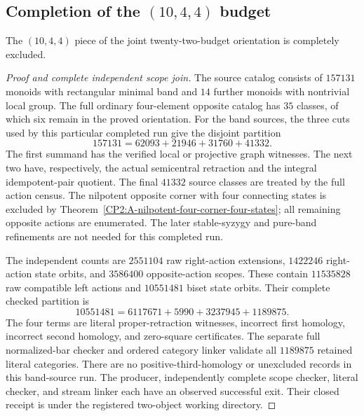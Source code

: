 \subsection{Completion of the $(10,4,4)$ budget}

\begin{proposition}
\label{CP2:A-oriented-eighteen-ten-four-four}
The $(10,4,4)$ piece of the joint twenty-two-budget orientation is
completely excluded.
\end{proposition}
\begin{proof}[Proof and complete independent scope join]
The source catalog consists of $157131$ monoids with rectangular minimal
band and $14$ further monoids with nontrivial local group.
The full ordinary four-element opposite catalog has $35$ classes,
of which six remain in the proved orientation.
For the band sources, the three cuts used by this particular completed
run give the disjoint partition
\[
 157131=62093+21946+31760+41332.
\]
The first summand has the verified local or projective graph witnesses.
The next two have, respectively, the actual semicentral retraction
and the integral idempotent-pair quotient.  The final $41332$ source
classes are treated by the full action census.  The nilpotent opposite
corner with four connecting states is excluded by
Theorem~\ref{CP2:A-nilpotent-four-corner-four-states};
all remaining opposite actions are enumerated.  The later stable-syzygy
and pure-band refinements are not needed for this completed run.

The independent counts are $2551104$ raw right-action extensions,
$1422246$ right-action state orbits, and $3586400$ opposite-action
scopes.  These contain $11535828$ raw compatible left actions and
$10551481$ biset state orbits.  Their complete checked partition is
\[
 10551481=6117671+5990+3237945+1189875.
\]
The four terms are literal proper-retraction witnesses, incorrect first
homology, incorrect second homology, and zero-square certificates.
The separate full normalized-bar checker and ordered category linker
validate all $1189875$ retained literal categories.  There are no
positive-third-homology or unexcluded records in this band-source run.
The producer, independently complete scope checker, literal checker,
and stream linker each have an observed successful exit.
Their closed receipt is
under the registered two-object working directory.


\end{proof}

